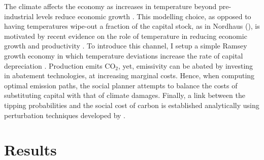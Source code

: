 \documentclass[12pt]{article}
\begin{document}
The climate affects the economy as increases in temperature beyond pre-industrial levels reduce economic growth \citep{pindyck_economic_2013, hambel_optimal_2021}. This modelling choice, as opposed to having temperatures wipe-out a fraction of the capital stock, as in Nordhaus (\citeyear{nordhaus_question_2008, nordhaus_estimates_2014,nordhaus_revisiting_2017}), is motivated by recent evidence on the role of temperature in reducing economic growth and productivity \citep{burke_global_2015, dietz_growth_2019}. To introduce this channel, I setup a simple Ramsey growth economy in which temperature deviations increase the rate of capital depreciation \citep{hambel_optimal_2021}. Production emits CO$_2$, yet, emissivity can be abated by investing in abatement technologies, at increasing marginal costs. Hence, when computing optimal emission paths, the social planner attempts to balance the costs of substituting capital with that of climate damages. Finally, a link between the tipping probabilities and the social cost of carbon is established analytically using perturbation techniques developed by \cite{grass_small-noise_2015}.

\section{Results}
\end{document}
